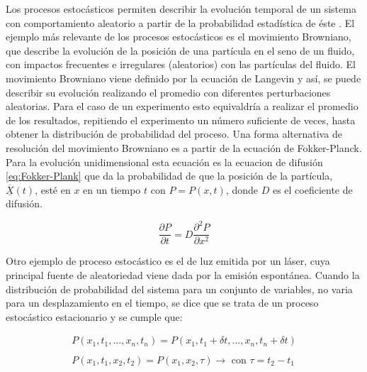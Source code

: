
	

Los procesos estoc\'asticos permiten describir la evoluci\'on temporal de un sistema con comportamiento aleatorio a partir de la probabilidad estad\'istica de \'este \cite{gardiner1985handbook}. El ejemplo m\'as relevante de los procesos estoc\'asticos es el movimiento Browniano, que describe la evoluci\'on de la posici\'on de una part\'icula en el seno de un fluido, con impactos frecuentes e irregulares (aleatorios) con las part\'iculas del fluido. El movimiento Browniano viene definido por la ecuaci\'on de Langevin y as\'i, se puede describir su evoluci\'on realizando el promedio con diferentes perturbaciones aleatorias. Para el caso de un experimento esto equivaldr\'ia a realizar el promedio de los resultados, repitiendo el experimento un n\'umero suficiente de veces, hasta obtener la distribuci\'on de probabilidad del proceso.  Una forma alternativa de resoluci\'on del movimiento Browniano es a partir de la ecuaci\'on de Fokker-Planck. Para la evolución unidimensional esta ecuación es la ecuacion de difusión \ref{eq:Fokker-Plank} que da la probabilidad de que la posición de la partícula, $\overline{\underline{X}}(t)$, esté en $x$ en un tiempo $t$ con $P = P(x, t)$, donde $D$ es el coeficiente de difusión.

	\begin{equation}
		\frac{\partial P}{\partial t} = D \frac{\partial^2 P}{\partial x^2}
		\label{eq:Fokker-Plank}
	\end{equation}

	Otro ejemplo de proceso estoc\'astico es el de luz emitida por un l\'aser, cuya principal fuente de aleatoriedad viene dada por la emisión espontánea. Cuando la distribuci\'on de probabilidad del sistema para un conjunto de variables, no varia para un desplazamiento en el tiempo, se dice que se trata de un proceso estoc\'astico estacionario y se cumple que:
	
	\begin{equation}
		\begin{matrix}
			P(x_1, t_1,..., x_n, t_n) = P(x_1, t_1+\delta t,..., x_n, t_n+\delta t) \\ \\
			P(x_1, t_1, x_2, t_2) = P(x_1, x_2, \tau) \rightarrow \textrm{      con    } \tau = t_2 - t_1
		\end{matrix}
	\end{equation}



